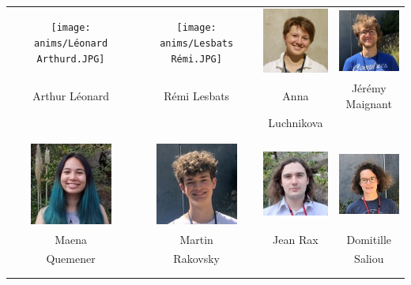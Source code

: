\vfill
\vspace{2mm}
\begin{center}
\begin{tabular}{cccc}
\texttt{[image: anims/Léonard Arthurd.JPG]} &
\texttt{[image: anims/Lesbats Rémi.JPG]} &
\includegraphics[angle=0,origin=c, width=27mm]{anims/Luchnikova Anna.JPG} &
\includegraphics[angle=0,origin=c, width=27mm]{anims/Maignant Jérémy.JPG} \\
Arthur Léonard & Rémi Lesbats & Anna & Jérémy Maignant \\ & & Luchnikova & \\ \\ \\ 

\includegraphics[angle=0,origin=c, width=27mm]{anims/Quemener Maena.jpg} &
\includegraphics[angle=0,origin=c, width=27mm]{anims/Rakovsky Martin.JPG} &
\includegraphics[angle=0,origin=c, width=27mm]{anims/Rax Jean.jpg} &
\includegraphics[angle=0,origin=c, width=27mm]{anims/Saliou Domitille.JPG} \\
Maena & Martin & Jean Rax & Domitille \\ Quemener & Rakovsky & & Saliou \\ \\ \\ 


\end{tabular}
\end{center}
